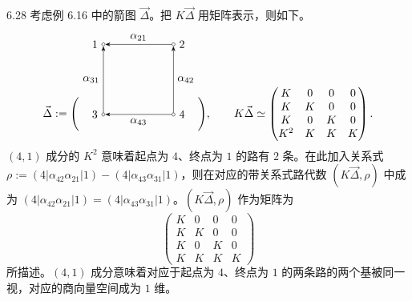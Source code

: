 \begin{example}{6.28}
考虑例 6.16 中的箭图 $\vec{\Delta}$。把 $K\vec{\Delta}$ 用矩阵表示，则如下。
\[
\vec{\Delta}:=
\Biggl(
\begin{tikzpicture}[baseline=-0.5ex]
  \node[draw,circle,inner sep=1pt,label=left:{$1$}] (v1) at (0,2.2) {};
  \node[draw,circle,inner sep=1pt,label=right:{$2$}] (v2) at (2.2,2.2) {};
  \node[draw,circle,inner sep=1pt,label=left:{$3$}] (v3) at (0,0) {};
  \node[draw,circle,inner sep=1pt,label=right:{$4$}] (v4) at (2.2,0) {};
  \draw[-{Stealth}] (v2) -- node[above]{$\alpha_{21}$} (v1);
  \draw[-{Stealth}] (v3) -- node[left]{$\alpha_{31}$} (v1);
  \draw[-{Stealth}] (v4) -- node[right]{$\alpha_{42}$} (v2);
  \draw[-{Stealth}] (v4) -- node[below]{$\alpha_{43}$} (v3);
\end{tikzpicture}
\Biggr),
\qquad
K\vec{\Delta}\simeq
\begin{pmatrix}
K & 0 & 0 & 0\\
K & K & 0 & 0\\
K & 0 & K & 0\\
K^2 & K & K & K
\end{pmatrix}.
\]
$(4,1)$ 成分的 $K^2$ 意味着起点为 $4$、终点为 $1$ 的路有 $2$ 条。在此加入关系式 $\rho:=(4|\alpha_{42}\alpha_{21}|1)-(4|\alpha_{43}\alpha_{31}|1)$，则在对应的带关系式路代数 $(K\vec{\Delta},\rho)$ 中成为 $(4|\alpha_{42}\alpha_{21}|1)=(4|\alpha_{43}\alpha_{31}|1)$。$(K\vec{\Delta},\rho)$ 作为矩阵为
\[
\begin{pmatrix}
K & 0 & 0 & 0\\
K & K & 0 & 0\\
K & 0 & K & 0\\
K & K & K & K
\end{pmatrix}
\]
所描述。$(4,1)$ 成分意味着对应于起点为 $4$、终点为 $1$ 的两条路的两个基被同一视，对应的商向量空间成为 $1$ 维。
\end{example}


